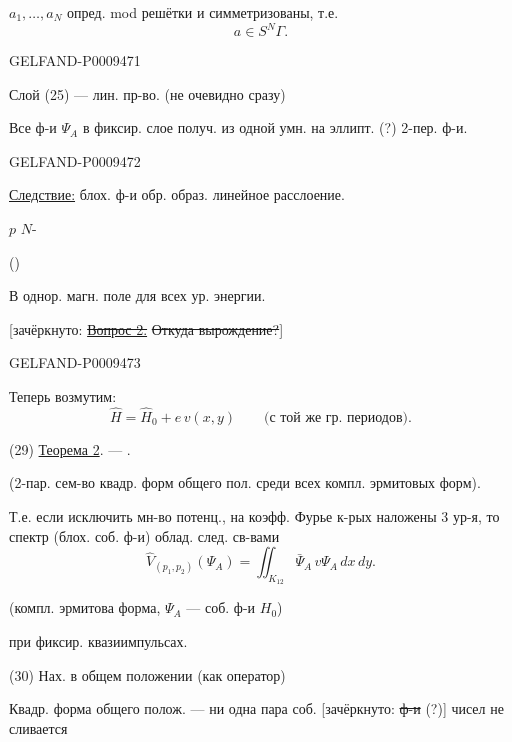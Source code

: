 $a_1,\ldots,a_N$ опред. mod решётки и симметризованы, т.е.
\[
 a\in S^N\Gamma.
\]

\begin{GelfandAdjacentEvidence}{GELFAND-P000947}{1}

Слой (25) --- лин. пр-во. (не очевидно сразу)

Все ф-и $\Psi_A$ в фиксир. слое получ. из одной умн. на эллипт. (?) 2-пер. ф-и.
\end{GelfandAdjacentEvidence}
\begin{GelfandAdjacentEvidence}{GELFAND-P000947}{2}


\underline{Следствие:} блох. ф-и обр. образ. линейное расслоение.

 $p$  $N$-

()

В однор. магн. поле  для всех ур. энергии.

[зачёркнуто: \underline{\sout{Вопрос 2.}} \sout{Откуда вырождение?}]
\end{GelfandAdjacentEvidence}
\begin{GelfandAdjacentEvidence}{GELFAND-P000947}{3}


Теперь возмутим:
\begin{equation*}
 \hat H=\hat H_0+e\,v(x,y)\qquad\text{(с той же гр. периодов).}
 \tag{28}
\end{equation*}

(29) \underline{Теорема 2}.  --- .

(2-пар. сем-во квадр. форм общего пол. среди всех компл. эрмитовых форм).

Т.е. если исключить мн-во потенц., на коэфф. Фурье к-рых наложены 3 ур-я, то спектр (блох. соб. ф-и) облад. след. св-вами
\begin{equation*}
 \hat V_{(p_1,p_2)}(\Psi_A)=\iint_{K_{12}}\bar\Psi_A\,v\Psi_A\,dx\,dy.
 \tag{30}
\end{equation*}

(компл. эрмитова форма, $\Psi_A$ --- соб. ф-и $H_0$)

при фиксир. квазиимпульсах.

(30) Нах. в общем положении (как оператор)

Квадр. форма общего полож. --- ни одна пара соб. [зачёркнуто: \sout{ф-и} (?)] чисел не сливается
\end{GelfandAdjacentEvidence}
